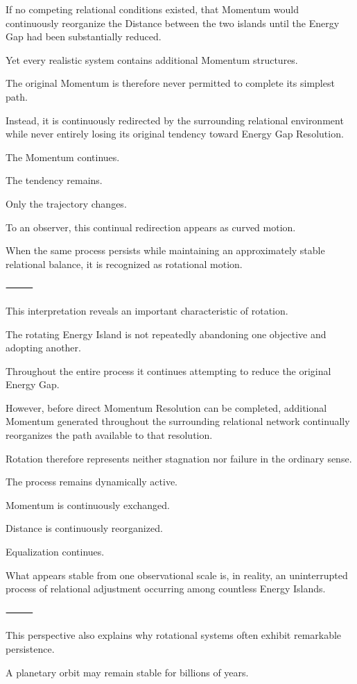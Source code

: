 If no competing relational conditions existed, that Momentum would continuously reorganize the Distance between the two islands until the Energy Gap had been substantially reduced.

Yet every realistic system contains additional Momentum structures.

The original Momentum is therefore never permitted to complete its simplest path.

Instead, it is continuously redirected by the surrounding relational environment while never entirely losing its original tendency toward Energy Gap Resolution.

The Momentum continues.

The tendency remains.

Only the trajectory changes.

To an observer, this continual redirection appears as curved motion.

When the same process persists while maintaining an approximately stable relational balance, it is recognized as rotational motion.

⸻

This interpretation reveals an important characteristic of rotation.

The rotating Energy Island is not repeatedly abandoning one objective and adopting another.

Throughout the entire process it continues attempting to reduce the original Energy Gap.

However, before direct Momentum Resolution can be completed, additional Momentum generated throughout the surrounding relational network continually reorganizes the path available to that resolution.

Rotation therefore represents neither stagnation nor failure in the ordinary sense.

The process remains dynamically active.

Momentum is continuously exchanged.

Distance is continuously reorganized.

Equalization continues.

What appears stable from one observational scale is, in reality, an uninterrupted process of relational adjustment occurring among countless Energy Islands.

⸻

This perspective also explains why rotational systems often exhibit remarkable persistence.

A planetary orbit may remain stable for billions of years.


